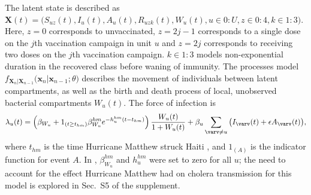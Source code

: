 \documentclass[10pt,letterpaper]{article}\usepackage[]{graphicx}\usepackage[table]{xcolor}
\newcommand\transmission{\beta}
\newcommand\asymptomRelativeInfect{\epsilon}
\newcommand\Wbeta[1]{\beta_{W#1}}
\newcommand\Whur[1]{\beta_{W#1}^{hm}}
\newcommand\hHur[1]{h_{#1}^{hm}}
\newcommand\tHur{t_{hm}}
\newcommand\vaccCounter{z}
\newcommand\paramVec{\theta}
\newcommand\seq[2]{{#1}\!:\!{#2}}
\begin{document}
The latent state is described as $\bm{X}(t) = \big(S_{u\vaccCounter}(t),\allowbreak I_{u}(t),\allowbreak A_{u}(t),\allowbreak R_{u\vaccCounter k}(t),\allowbreak W_u(t),\allowbreak u \in \seq{0}{U},\allowbreak \vaccCounter \in \seq{0}{4},\allowbreak k \in \seq{1}{3}\big)$.
Here, $\vaccCounter=0$ corresponds to unvaccinated, $\vaccCounter=2j-1$ corresponds to a single dose on the $j$th vaccination campaign in unit $u$ and $\vaccCounter=2j$ corresponds to receiving two doses on the $j$th vaccination campaign.
$k\in\seq{1}{3}$ models non-exponential duration in the recovered class before waning of immunity.
The processes model $f_{\bm{X}_n|\bm{X}_{n-1}}\big(\bm{x}_n|\bm{x}_{n-1};\paramVec\big)$ describes the movement of individuals between latent compartments, as well as the birth and death process of local, unobserved bacterial compartments $W_{u}(t)$.
The force of infection is
\begin{equation}
\label{eq:model3:foi}
\lambda_u(t) = \left(\Wbeta{_u} + 1_{(t \geq \tHur)}\Whur{_u} e^{-\hHur{u}\left(t - \tHur\right)}\right) \frac{W_u(t)}{1+W_u(t)} + \transmission_u \sum_{{\varv}\neq u}\big(I_{\varv}(t)+ \asymptomRelativeInfect A_{\varv}(t)\big),
\end{equation}
where $\tHur$ is the time Hurricane Matthew struck Haiti \cite{ferreirai16}, and $1_{(A)}$ is the indicator function for event $A$.
In \cite{lee20}, $\Whur{_u}$ and $\hHur{u}$ were set to zero for all $u$;
the need to account for the effect Hurricane Matthew had on cholera transmission for this model is explored in Sec.~S5 of the supplement.
\end{document}
